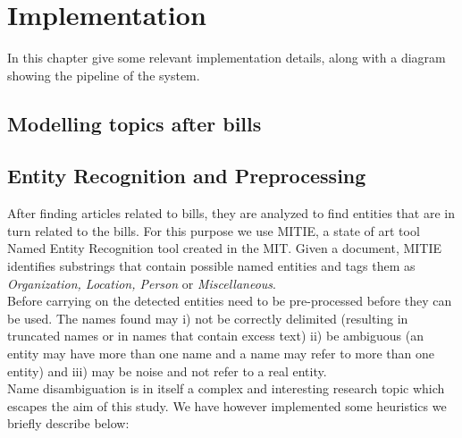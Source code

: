 \section{Implementation}\label{sec:implementation}

In this chapter give some relevant implementation details, along with a diagram showing the pipeline of the system. \\

\subsection{Modelling topics after bills }\label{subsec:topic}

\subsection{Entity Recognition and Preprocessing}\label{subsec:getting-entities}

After finding articles related to bills, they are analyzed to find entities that are in turn related to the bills. For this purpose we use MITIE, a state of art tool Named Entity Recognition tool created in the MIT. Given a document, MITIE identifies substrings that contain possible named entities and tags them as \emph{Organization, Location, Person} or \emph{Miscellaneous}.\\

Before carrying on the detected entities need to be pre-processed before they can be used. The names found may i) not be correctly delimited (resulting in truncated names or in names that contain excess text) ii) be ambiguous (an entity may have more than one name and a name may refer to more than one entity) and iii) may be noise and not refer to a real entity. \\

Name disambiguation is in itself a complex and interesting research topic which escapes the aim of this study. We have however implemented some heuristics we briefly describe below:\\

